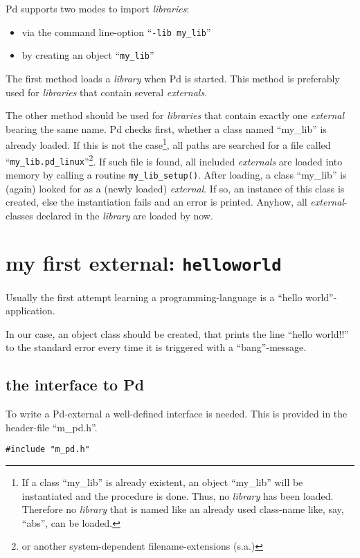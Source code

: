 \documentclass[12pt, a4paper,english,titlepage]{article}
\begin{document}
Pd supports two modes to import {\em libraries}:

\begin{itemize}
\item via the command line-option ``{\tt -lib my\_lib}''
\item by creating an object ``{\tt my\_lib}''
\end{itemize}

The first method loads a {\em library} when Pd is started.
This method is preferably used for {\em libraries} that contain several {\em externals}.

The other method should be used for {\em libraries} that contain exactly
one {\em external} bearing the same name.
Pd checks first, whether a class named ``my\_lib'' is already loaded.
If this is not the case\footnote{
If a class ``my\_lib'' is already existent, an object ``my\_lib'' will be instantiated
and the procedure is done. 
Thus, no {\em library} has been loaded.
Therefore no {\em library} that is named like an already used class-name like, say, ``abs'',
can be loaded.}, all paths are searched for a file called
``{\tt my\_lib.pd\_linux}''\footnote{or another system-dependent filename-extensions (s.a.)}.
If such file is found, all included {\em externals} are loaded into memory by calling a
routine \verb+my_lib_setup()+.
After loading, a class ``my\_lib'' is (again) looked for as a (newly loaded) {\em external}.
If so, an instance of this class is created, else the instantiation fails and an error is
printed.
Anyhow, all {\em external}-classes declared in the {\em library} are loaded by now.


\section{my first external: {\tt helloworld}}
Usually the first attempt learning a programming-language is a ``hello world''-application.

In our case, an object class should be created, that prints the line ``hello world!!'' to
the standard error every time it is triggered with a ``bang''-message.



\subsection{the interface to Pd}
To write a Pd-external a well-defined interface is needed.
This is provided in the header-file ``m\_pd.h''.

\begin{verbatim}
#include "m_pd.h"
\end{verbatim}
\end{document}
